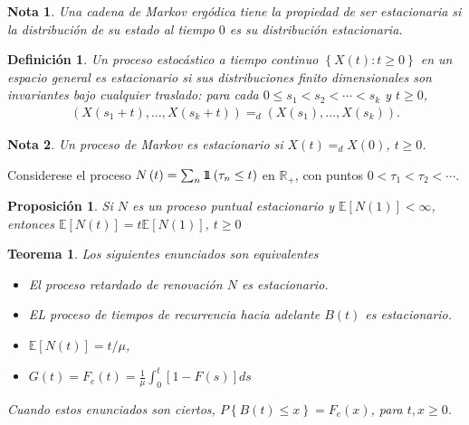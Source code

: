 \documentclass{article}
\newtheorem{Def}{Definición}[section]
\newtheorem{Teo}{Teorema}[section]
\newtheorem{Note}{Nota}[section]
\newtheorem{Prop}{Proposición}[section]
\newcommand{\rea}{\mathbb{R}}
\newcommand{\esp}{\mathbb{E}}
\newcommand{\indora}{\mbox{$1$\hspace{-0.8ex}$1$}}
\numberwithin{equation}{section}
\begin{document}
\begin{Note}
Una cadena de Markov erg\'odica tiene la propiedad de ser estacionaria si la distribuci\'on de su estado al tiempo $0$ es su distribuci\'on estacionaria.
\end{Note}


\begin{Def}
Un proceso estoc\'astico a tiempo continuo $\left\{X\left(t\right):t\geq0\right\}$ en un espacio general es estacionario si sus distribuciones finito dimensionales son invariantes bajo cualquier  traslado: para cada $0\leq s_{1}<s_{2}<\cdots<s_{k}$ y $t\geq0$,
\begin{eqnarray*}
\left(X\left(s_{1}+t\right),\ldots,X\left(s_{k}+t\right)\right)=_{d}\left(X\left(s_{1}\right),\ldots,X\left(s_{k}\right)\right).
\end{eqnarray*}
\end{Def}

\begin{Note}
Un proceso de Markov es estacionario si $X\left(t\right)=_{d}X\left(0\right)$, $t\geq0$.
\end{Note}

Considerese el proceso $N\left(t\right)=\sum_{n}\indora\left(\tau_{n}\leq t\right)$ en $\rea_{+}$, con puntos $0<\tau_{1}<\tau_{2}<\cdots$.

\begin{Prop}
Si $N$ es un proceso puntual estacionario y $\esp\left[N\left(1\right)\right]<\infty$, entonces $\esp\left[N\left(t\right)\right]=t\esp\left[N\left(1\right)\right]$, $t\geq0$

\end{Prop}

\begin{Teo}
Los siguientes enunciados son equivalentes
\begin{itemize}
\item[i)] El proceso retardado de renovaci\'on $N$ es estacionario.

\item[ii)] EL proceso de tiempos de recurrencia hacia adelante $B\left(t\right)$ es estacionario.


\item[iii)] $\esp\left[N\left(t\right)\right]=t/\mu$,


\item[iv)] $G\left(t\right)=F_{e}\left(t\right)=\frac{1}{\mu}\int_{0}^{t}\left[1-F\left(s\right)\right]ds$
\end{itemize}
Cuando estos enunciados son ciertos, $P\left\{B\left(t\right)\leq x\right\}=F_{e}\left(x\right)$, para $t,x\geq0$.

\end{Teo}
\end{document}
